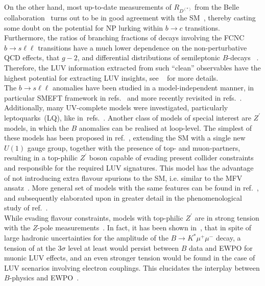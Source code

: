 On the other hand, most up-to-date measurements of $R_{D^{(*)}}$ from the Belle collaboration~\cite{Hirose:2016wfn,Abdesselam:2019dgh} turns out to be in good agreement with the SM~\cite{Bigi:2016mdz,Bernlochner:2017jka,Bigi:2017jbd,Jaiswal:2017rve}, thereby casting some doubt on the potential for NP lurking within $b\to c$ transitions. 
Furthermore, the ratios of branching fractions of decays involving the FCNC $b \to s \ell \ell$ transitions have a much lower dependence on the  non-perturbative QCD effects, that $g-2$, and differential distributions of semileptonic $B$-decays~\cite{Capdevila:2016ivx,Serra:2016ivr,Wehle:2016yoi,Alguero:2019pjc} . Therefore, the LUV information extracted from such ``clean'' observables have the highest potential for extracting LUV insights, see ~\cite{Kou:2018nap} for more details.\\
The  $ b \to s \ell \ell$ anomalies have been studied in a model-independent manner, in particular SMEFT framework in refs.~\cite{DAmico:2017mtc,Geng:2017svp,Capdevila:2017bsm,Ciuchini:2017mik,Hiller:2017bzc} and more recently revisited in refs.~\cite{Ciuchini:2019usw,Aebischer:2019mlg,Alok:2019ufo,Alguero:2019ptt,Kowalska:2019ley,Arbey:2019duh,Datta:2019zca}.  Additionally, many UV-complete models were investigated, particularly leptoquarks~(LQ), like in~refs.~\cite{Calibbi:2015kma,Dorsner:2016wpm,Buttazzo:2017ixm,Kumar:2018kmr,Cornella:2019hct}. Another class of models of special interest are $Z^\prime$ models, in which the $B$ anomalies can be realised at loop-level. The simplest of these models has been proposed in ref.~\cite{Kamenik:2017tnu}, extending the SM with a single new $U(1)$ gauge group, together with the presence of top- and muon-partners, resulting in a top-philic $Z^\prime$ boson capable of evading present collider constraints~\cite{Fox:2018ldq} and responsible for the required LUV signatures. This model has the advantage of not introducing extra flavour spurions to the SM, i.e. similar to the MFV ansatz~\cite{Buras:2000dm,DAmbrosio:2002vsn,Kagan:2009bn}.  More general set of models with the same features can be found  in ref.~\cite{Celis:2017doq},  and subsequently elaborated upon in greater detail in the phenomenological study of ref.~\cite{Camargo-Molina:2018cwu}. \\
While evading flavour constraints, models with top-philic $Z^\prime$ are in strong tension with the $Z$-pole measurements~\cite{Camargo-Molina:2018cwu,Efrati:2015eaa}. In fact, it has been shown in~\cite{Ciuchini:2019usw}, that in spite of  large hadronic uncertainties for the  amplitude of the $B \to K^{*} \mu^{+} \mu^{-}$ decay, a tension of at the 3$\sigma$ level at least would persist between $B$ data and EWPO for muonic LUV effects, and an even stronger tension would be found in the case of LUV scenarios involving electron couplings. This elucidates the interplay between $B$-physics and EWPO~\cite{Bhattacharya:2014wla,Feruglio:2016gvd,Celis:2017doq,Buttazzo:2017ixm,Kumar:2018kmr,Ciuchini:2019usw,Aebischer:2019mlg,Cornella:2019hct}. \\

